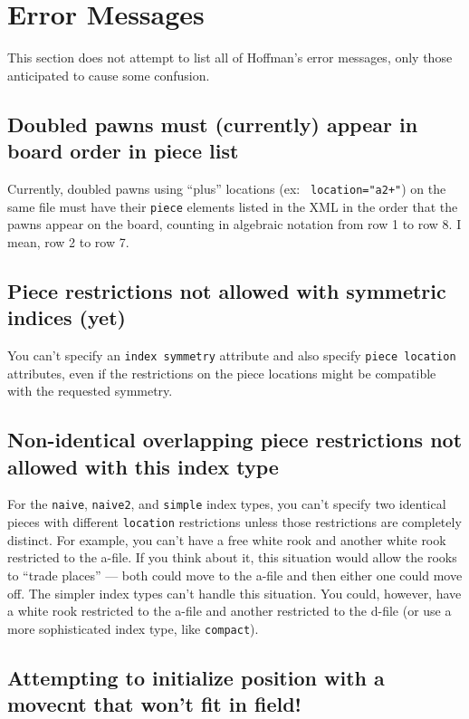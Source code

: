 \documentclass[11pt]{article}
\begin{document}
\vfill\eject

\section{Error Messages}

This section does not attempt to list all of Hoffman's error messages,
only those anticipated to cause some confusion.

\subsection{Doubled pawns must (currently) appear in board order in piece list}

Currently, doubled pawns using ``plus'' locations (ex: {\tt
location="a2+"}) on the same file must have their {\tt piece} elements
listed in the XML in the order that the pawns appear on the board,
counting in algebraic notation from row 1 to row 8.  I mean, row 2 to
row 7.

\subsection{Piece restrictions not allowed with symmetric indices (yet)}

You can't specify an {\tt index symmetry} attribute and also specify
{\tt piece location} attributes, even if the restrictions on the piece
locations might be compatible with the requested symmetry.

\subsection{Non-identical overlapping piece restrictions not allowed with this index type}

For the {\tt naive}, {\tt naive2}, and {\tt simple} index types, you
can't specify two identical pieces with different {\tt location}
restrictions unless those restrictions are completely distinct.  For
example, you can't have a free white rook and another white rook
restricted to the a-file.  If you think about it, this situation would
allow the rooks to ``trade places'' --- both could move to the a-file
and then either one could move off.  The simpler index types can't
handle this situation.  You could, however, have a white rook
restricted to the a-file and another restricted to the d-file (or use
a more sophisticated index type, like {\tt compact}).

\subsection{Attempting to initialize position with a movecnt that won't fit in field!}
\end{document}

